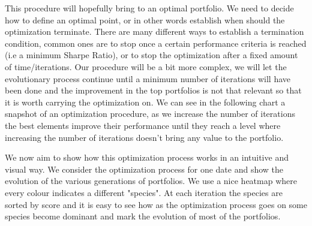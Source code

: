 This procedure will hopefully bring to an optimal portfolio. We need to decide how to define an optimal point, or in other words establish when should the optimization terminate. There are many different ways to establish a termination condition, common ones are to stop once a certain performance criteria is reached (i.e a minimum Sharpe Ratio), or to stop the optimization after a fixed amount of time/iterations. Our procedure will be a bit more complex, we will let the evolutionary process continue until a minimum number of iterations will have been done and the improvement in the top portfolios is not that relevant so that it is worth carrying the optimization on. We can see in the following chart a snapshot of an optimization procedure, as we increase the number of iterations the best elements improve their performance until they reach a level where increasing the number of iterations doesn't bring any value to the portfolio.\\


We now aim to show how this optimization process works in an intuitive and visual way. We consider the optimization process for one date and show the evolution of the various generations of portfolios. We use a nice heatmap where every colour indicates a different "species". At each iteration the species are sorted by score and it is easy to see how as the optimization process goes on some species become dominant and mark the evolution of most of the portfolios.

